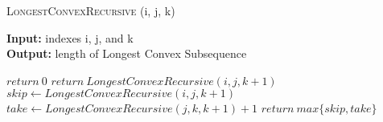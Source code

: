 \documentclass{article}
\begin{document}
\begin{algorithm} \caption{\textsc{LongestConvexRecursive} (i, j, k)}\label{alg:seb}
    {\bf Input:} indexes i, j, and k\\
    {\bf Output:} length of Longest Convex Subsequence
    \begin{algorithmic}[1]
            \State$return\ 0$
            \State$return\ LongestConvexRecursive(i, j, k +1)$
        \EndIf{}
        \Else{}
            \State$skip \gets LongestConvexRecursive(i, j, k+1)$
            \State$take \gets LongestConvexRecursive(j, k, k+1) +1$
        \State$return\ max\{skip, take\}$
        \EndIf{}
    \end{algorithmic}
\end{algorithm}
\todo{}
\end{document}
